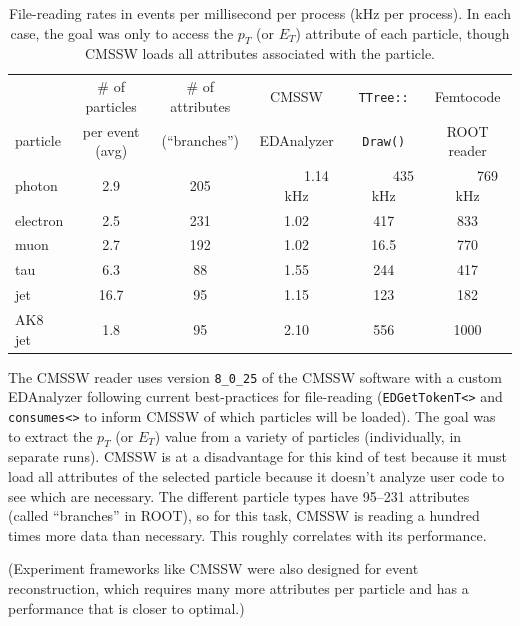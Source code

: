 \documentclass[12pt]{article}
\begin{document}
\begin{table}[t]
\caption{\label{cmssw-table} File-reading rates in events per millisecond per process (kHz per process). In each case, the goal was only to access the $p_T$ (or $E_T$) attribute of each particle, though CMSSW loads all attributes associated with the particle.}

\begin{center}
\begin{tabular}{l c c c c c}
          &\# of particles & \# of attributes & CMSSW &{\tt TTree::} & Femtocode \\
particle  & per event (avg) & (``branches'') & EDAnalyzer &{\tt Draw()} & ROOT reader \\\hline
photon    & 2.9    & 205         & \mbox{\ \ \ \ \ } 1.14 kHz   &   \mbox{\ \ \ \ \ } 435 kHz       &   \mbox{\ \ \ \ \ } 769 kHz \\
electron  & 2.5     & 231         & 1.02   &   417       &   833        \\
muon      & 2.7     & 192         & 1.02   &   16.5      &   770        \\
tau       & 6.3     &  88         & 1.55   &   244       &   417        \\
jet       & 16.7    &  95         & 1.15   &   123       &   182        \\
AK8 jet   & 1.8     &  95         & 2.10   &   556       &   1000       \\
\end{tabular}
\end{center}
\end{table}

The CMSSW reader uses version {\tt 8\_0\_25} of the CMSSW software with a custom EDAnalyzer following current best-practices for file-reading ({\tt EDGetTokenT<>} and {\tt consumes<>} to inform CMSSW of which particles will be loaded). The goal was to extract the $p_T$ (or $E_T$) value from a variety of particles (individually, in separate runs). CMSSW is at a disadvantage for this kind of test because it must load all attributes of the selected particle because it doesn't analyze user code to see which are necessary. The different particle types have 95--231 attributes (called ``branches'' in ROOT), so for this task, CMSSW is reading a hundred times more data than necessary. This roughly correlates with its performance.

(Experiment frameworks like CMSSW were also designed for event reconstruction, which requires many more attributes per particle and has a performance that is closer to optimal.)
\end{document}
